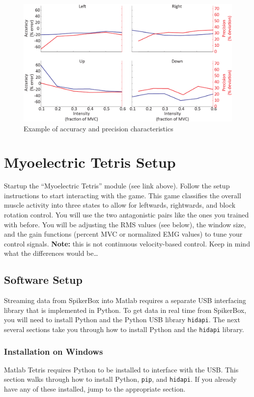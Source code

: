 \documentclass[10pt,oneside,a4paper]{article}
\begin{document}
\begin{figure}[H]
\centering
\includegraphics[width=\textwidth]{fig4.png}
\caption{Example of accuracy and precision characteristics}
\end{figure}
\section{Myoelectric Tetris Setup}
Startup the ``Myoelectric Tetris'' module (see link above).  Follow the setup instructions to start interacting with the game.  This game classifies the overall muscle activity into three states to allow for leftwards, rightwards, and block rotation control.  You will use the two antagonistic pairs like the ones you trained with before.  You will be adjusting the RMS values (see below), the window size, and the gain functions (percent MVC or normalized EMG values) to tune your control signals.  \textbf{Note:} this is not continuous velocity-based control.  Keep in mind what the differences would be\dots
\subsection{Software Setup}
Streaming data from SpikerBox into Matlab requires a separate USB interfacing library that is implemented in Python. To get data in real time from SpikerBox, you will need to install Python and the Python USB library \texttt{hidapi}. The next several sections take you through how to install Python and the \texttt{hidapi} library.
\subsubsection{Installation on Windows}
Matlab Tetris requires Python to be installed to interface with the USB. This section walks through how to install Python, \texttt{pip}, and \texttt{hidapi}. If you already have any of these installed, jump to the appropriate section.
\end{document}
